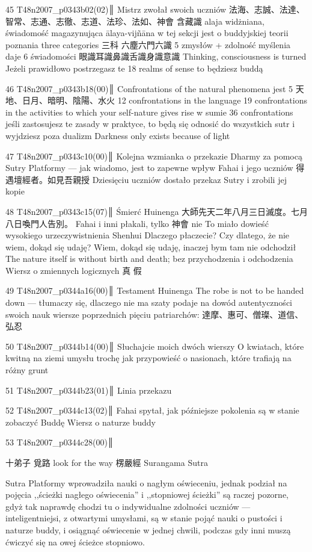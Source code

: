 45 T48n2007_p0343b02(02)║
Mistrz zwołał swoich uczniów 法海、志誠、法達、智常、志通、志徹、志道、法珍、法如、神會
含藏識 alaja widżniana, świadomość magazynująca ālaya-vijñāna
w tej sekcji jest o buddyjskiej teorii poznania
three categories 三科
六塵六門六識 5 zmysłów + zdolność myślenia daje 6 świadomości
眼識耳識鼻識舌識身識意識
Thinking, consciousness is turned
Jeżeli prawidłowo postrzegasz te 18 realms of sense
to będziesz buddą

46 T48n2007_p0343b18(00)║
Confrontations of the natural phenomena jest 5
天地、日月、暗明、陰陽、水火
12 confrontations in the language
19 confrontations in the activities to which your self-nature gives rise
w sumie 36 confrontations
jeśli zastosujesz te zasady w praktyce, to będą się odnosić do wszystkich sutr i wyjdziesz poza dualizm
Darkness only exists because of light

47 T48n2007_p0343c10(00)║
Kolejna wzmianka o przekazie Dharmy za pomocą Sutry Platformy --- jak wiadomo, jest to zapewne wpływ Fahai i jego uczniów
得遇壇經者。如見吾親授
Dziesięciu uczniów dostało przekaz Sutry i zrobili jej kopie

48 T48n2007_p0343c15(07)║
Śmierć Huinenga
大師先天二年八月三日滅度。七月八日喚門人告別。
Fahai i inni płakali, tylko 神會 nie
To miało dowieść wysokiego urzeczywistnienia Shenhui
Dlaczego płaczecie? Czy dlatego, że nie wiem, dokąd się udaję? Wiem, dokąd się udaję, inaczej bym tam nie odchodził
The nature itself is without birth and death; bez przychodzenia i odchodzenia
Wiersz o zmiennych logicznych 真 假

49 T48n2007_p0344a16(00)║
Testament Huinenga
The robe is not to be handed down --- tłumaczy się, dlaczego nie ma szaty
podaje na dowód autentyczności swoich nauk wiersze poprzednich pięciu patriarchów: 達摩、惠可、僧璨、道信、弘忍

50 T48n2007_p0344b14(00)║
Słuchajcie moich dwóch wierszy
O kwiatach, które kwitną na ziemi umysłu
trochę jak przypowieść o nasionach, które trafiają na różny grunt

51 T48n2007_p0344b23(01)║
Linia przekazu

52 T48n2007_p0344c13(02)║
Fahai spytał, jak późniejsze pokolenia są w stanie zobaczyć Buddę
Wiersz o naturze buddy

53 T48n2007_p0344c28(00)║

十弟子
覓路 look for the way
楞嚴經 Surangama Sutra

\fi

Sutra Platformy wprowadziła nauki o nagłym oświeceniu, jednak podział na pojęcia ,,ścieżki nagłego oświecenia'' i ,,stopniowej ścieżki'' są raczej pozorne, gdyż tak naprawdę chodzi tu o indywidualne zdolności uczniów --- inteligentniejsi, z otwartymi umysłami, są w stanie pojąć nauki o pustości i naturze buddy, i osiągnąć oświecenie w jednej chwili, podczas gdy inni muszą ćwiczyć się na owej ścieżce stopniowo.

